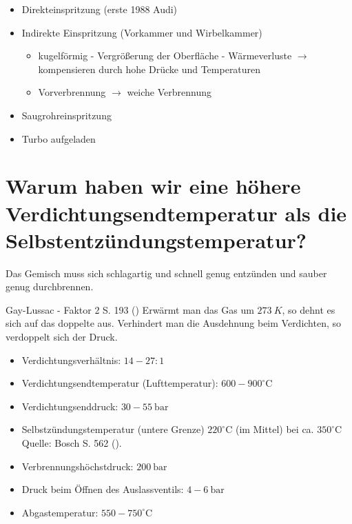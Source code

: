 \begin{itemize}
\item
  Direkteinspritzung (erste 1988 Audi)
\item
  Indirekte Einspritzung (Vorkammer und Wirbelkammer)

  \begin{itemize}
  \item
    kugelförmig - Vergrößerung der Oberfläche - Wärmeverluste $\to$
    kompensieren durch hohe Drücke und Temperaturen
  \item
    Vorverbrennung $\to$ weiche Verbrennung
  \end{itemize}
\item
  Saugrohreinspritzung
\item
  Turbo aufgeladen
\end{itemize}

\section{Warum haben wir eine höhere Verdichtungsendtemperatur als die
Selbstentzündungstemperatur?}\label{warum-haben-wir-eine-hoehere-verdichtungsendtemperatur-als-die-selbstentzuendungstemperatur}

Das Gemisch muss sich schlagartig und schnell genug entzünden und sauber
genug durchbrennen.

Gay-Lussac - Faktor 2 S. 193 (\textcite{brand:2020:fachkundeKfz}) Erwärmt
man das Gas um $273~K$, so dehnt es sich auf das doppelte aus.
Verhindert man die Ausdehnung beim Verdichten, so verdoppelt sich der
Druck.

\begin{itemize}
\item
  Verdichtungsverhältnis: $14 - 27:1$
\item
  Verdichtungsendtemperatur (Lufttemperatur):
  $600 - 900^\circ\text{C}$
\item
  Verdichtungsenddruck: $30 - 55~\text{bar}$
\item
  Selbstzündungstemperatur (untere Grenze) $220^\circ\text{C}$ (im
  Mittel) bei ca. $350^\circ\text{C}$ Quelle: Bosch S. 562
  (\textcite{reif:2022:boschkraftfahrtechnisches}).
\item
  Verbrennungshöchstdruck: $200~\text{bar}$
\item
  Druck beim Öffnen des Auslassventils: $4 - 6~\text{bar}$
\item
  Abgastemperatur: $550 - 750^\circ\text{C}$
\end{itemize}


